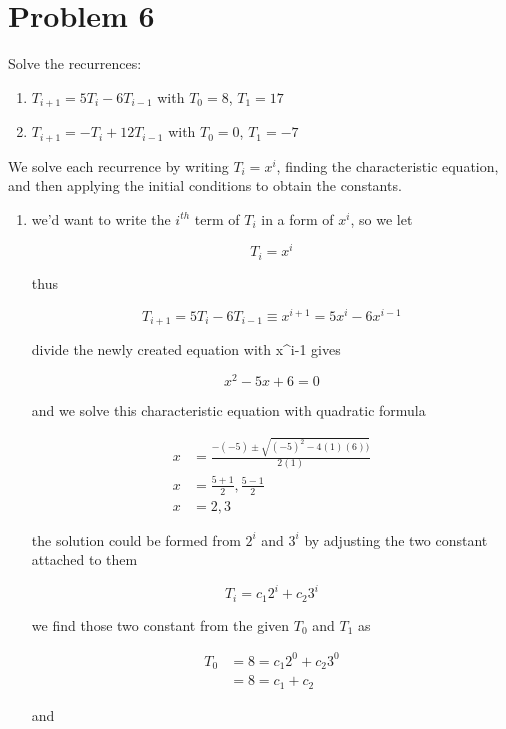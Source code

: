 \section*{Problem 6}
Solve the recurrences:
\begin{enumerate}[label=\arabic*.]
    \item $T_{i+1} = 5T_i - 6T_{i-1}$ with $T_0 = 8$, $T_1 = 17$
    \item $T_{i+1} = -T_i + 12T_{i-1}$ with $T_0 = 0$, $T_1 = -7$
\end{enumerate}

\medskip
\solution

We solve each recurrence by writing $T_i = x^i$, finding the characteristic equation, and then applying the initial conditions to obtain the constants.

\begin{enumerate}
    \item we'd want to write the $i^{th}$ term of $T_i$ in a form of $x^i$, so we let

        \[T_i = x^i\]

        thus 

        \[T_{i+1} = 5T_i - 6T_{i-1} \equiv x^{i+1} = 5x^i - 6x^{i-1}\]

        divide the newly created equation with x^{i-1} gives

        \[x^2 - 5x + 6 = 0\]

        and we solve this characteristic equation with quadratic formula

        \begin{align*}
            x &= \frac{-(-5) \pm \sqrt{(-5)^2 - 4(1)(6))}}{2(1)} \\
            x &= \frac{5 + 1}{2}, \frac{5 - 1}{2} \\
            x &= 2, 3
        \end{align*}

        the solution could be formed from $2^i$ and $3^i$  by adjusting the two constant attached to them

        \[T_i = c_1 2^i + c_2 3^i\]

        we find those two constant from the given $T_0$ and $T_1$ as

        \begin{align*}
        T_0 &= 8 = c_1 2^0 + c_2 3^0 \\
            &= 8 = c_1 + c_2 \tag{i} 
        \end{align*}

        and 


\end{enumerate}

